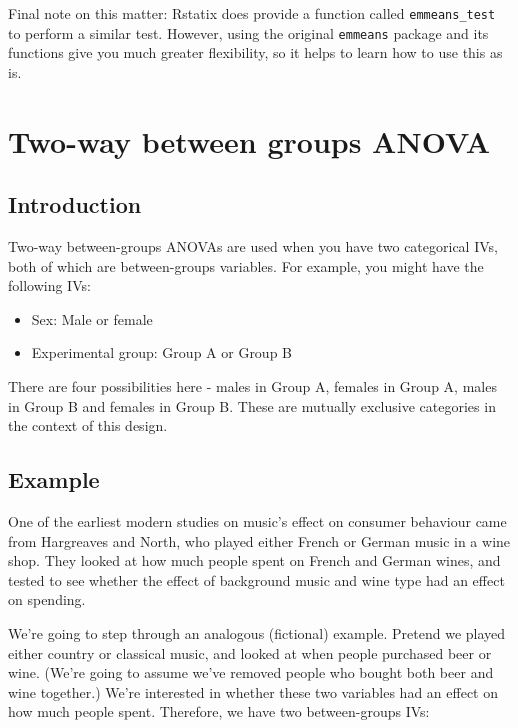 \documentclass[
]{book}
\providecommand{\tightlist}{%
  \setlength{\itemsep}{0pt}\setlength{\parskip}{0pt}}
\begin{document}
Final note on this matter: Rstatix does provide a function called \texttt{emmeans\_test} to perform a similar test. However, using the original \texttt{emmeans} package and its functions give you much greater flexibility, so it helps to learn how to use this as is.

\section{Two-way between groups ANOVA}\label{two-way-between-groups-anova}

\subsection{Introduction}\label{introduction}

Two-way between-groups ANOVAs are used when you have two categorical IVs, both of which are between-groups variables. For example, you might have the following IVs:

\begin{itemize}
\tightlist
\item
  Sex: Male or female
\item
  Experimental group: Group A or Group B
\end{itemize}

There are four possibilities here - males in Group A, females in Group A, males in Group B and females in Group B. These are mutually exclusive categories in the context of this design.

\subsection{Example}\label{example-2}

One of the earliest modern studies on music's effect on consumer behaviour came from Hargreaves and North, who played either French or German music in a wine shop. They looked at how much people spent on French and German wines, and tested to see whether the effect of background music and wine type had an effect on spending.

We're going to step through an analogous (fictional) example. Pretend we played either country or classical music, and looked at when people purchased beer or wine. (We're going to assume we've removed people who bought both beer and wine together.) We're interested in whether these two variables had an effect on how much people spent. Therefore, we have two between-groups IVs:
\end{document}
